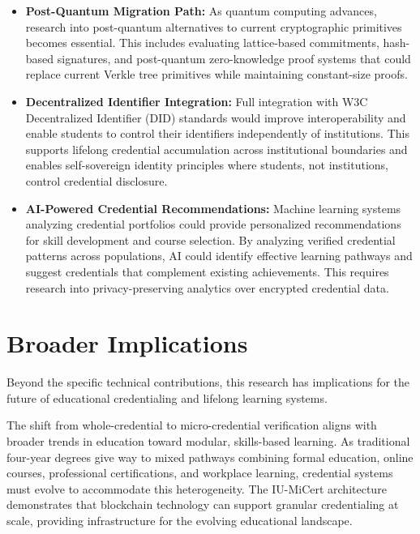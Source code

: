 \begin{itemize}
    \item \textbf{Post-Quantum Migration Path:} As quantum computing advances, research into post-quantum alternatives to current cryptographic primitives becomes essential. This includes evaluating lattice-based commitments, hash-based signatures, and post-quantum zero-knowledge proof systems that could replace current Verkle tree primitives while maintaining constant-size proofs.

    \item \textbf{Decentralized Identifier Integration:} Full integration with W3C Decentralized Identifier (DID) standards would improve interoperability and enable students to control their identifiers independently of institutions. This supports lifelong credential accumulation across institutional boundaries and enables self-sovereign identity principles where students, not institutions, control credential disclosure.

    \item \textbf{AI-Powered Credential Recommendations:} Machine learning systems analyzing credential portfolios could provide personalized recommendations for skill development and course selection. By analyzing verified credential patterns across populations, AI could identify effective learning pathways and suggest credentials that complement existing achievements. This requires research into privacy-preserving analytics over encrypted credential data.
\end{itemize}

\section{Broader Implications}
\label{sec:broader-implications}

Beyond the specific technical contributions, this research has implications for the future of educational credentialing and lifelong learning systems.

The shift from whole-credential to micro-credential verification aligns with broader trends in education toward modular, skills-based learning. As traditional four-year degrees give way to mixed pathways combining formal education, online courses, professional certifications, and workplace learning, credential systems must evolve to accommodate this heterogeneity. The IU-MiCert architecture demonstrates that blockchain technology can support granular credentialing at scale, providing infrastructure for the evolving educational landscape.

